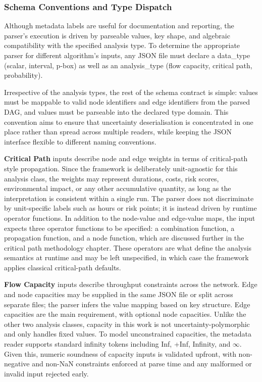 \documentclass[12pt]{report}
\begin{document}
\subsubsection{Schema Conventions and Type Dispatch}

Although metadata labels are useful for documentation and reporting, the parser’s execution is driven by parseable values, key shape, and algebraic compatibility with the specified analysis type. To determine the appropriate parser for different algorithm’s inputs, any JSON file must declare a data\_type (scalar, interval, p-box) as well as an analysis\_type (flow capacity, critical path, probability).

Irrespective of the analysis types, the rest of the schema contract is simple: values must be mappable to valid node identifiers and edge identifiers from the parsed DAG, and values must be parseable into the declared type domain. This convention aims to ensure that uncertainty deserialisation is concentrated in one place rather than spread across multiple readers, while keeping the JSON interface flexible to different naming conventions.

\textbf{Critical Path} inputs describe node and edge weights in terms of critical-path style propagation. Since the framework is deliberately unit-agnostic for this analysis class, the weights may represent durations, costs, risk scores, environmental impact, or any other accumulative quantity, as long as the interpretation is consistent within a single run. The parser does not discriminate by unit-specific labels such as hours or risk points; it is instead driven by runtime operator functions. In addition to the node-value and edge-value maps, the input expects three operator functions to be specified: a combination function, a propagation function, and a node function, which are discussed further in the critical path methodology chapter. These operators are what define the analysis semantics at runtime and may be left unspecified, in which case the framework applies classical critical-path defaults.

\textbf{Flow Capacity} inputs describe throughput constraints across the network. Edge and node capacities may be supplied in the same JSON file or split across separate files; the parser infers the value mapping based on key structure. Edge capacities are the main requirement, with optional node capacities. Unlike the other two analysis classes, capacity in this work is not uncertainty-polymorphic and only handles fixed values. To model unconstrained capacities, the metadata reader supports standard infinity tokens including Inf, +Inf, Infinity, and $\infty$. Given this, numeric soundness of capacity inputs is validated upfront, with non-negative and non-NaN constraints enforced at parse time and any malformed or invalid input rejected early.
\end{document}
